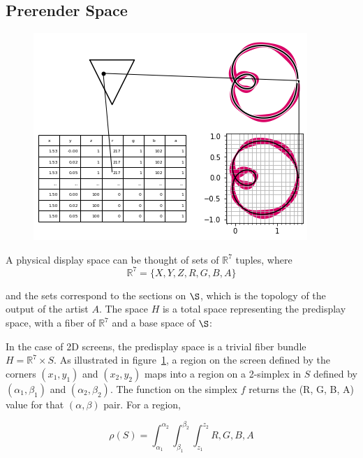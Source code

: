 \documentclass[../main.tex]{subfiles}
\begin{document}
\subsection{Prerender Space}
\label{sec:display}

\begin{figure}[h]
    \includegraphics[width=.4\linewidth]{figures/sections/math/render.png}
    \caption{}
    \label{fig:render}
\end{figure}

A physical display space can be thought of sets of $\mathbb{R}^{7}$ tuples, where 
\begin{equation}
    \mathbb{R}^{7} = \{X, Y, Z, R, G, B, A\}
\end{equation}

and the sets correspond to the sections on $\S$, which is the topology of the output of the artist $A$. The space $H$ is a total space representing the predisplay space, with a fiber of $\mathbb{R}^7$ and a base space of $\S$:



In the case of 2D screens, the predisplay space is a trivial fiber bundle $H=\mathbb{R}^{7}\times S$. As illustrated in figure~\ref{fig:render}, a region on the screen defined by the corners $(x_1, y_1)$ and $(x_2, y_2)$ maps into a region on a 2-simplex in $S$ defined by $(\alpha_1, \beta_1)$ and $(\alpha_2, \beta_2)$. The function on the simplex $f$ returns the (R, G, B, A) value for that $(\alpha, \beta)$ pair. For a region, 

\begin{equation*}
\rho(S) = \int_{\alpha_1}^{\alpha_2}\int_{\beta_1}^{\beta_2}\int_{z_1}^{z_2}{R, G, B, A}  
\end{equation*}
\end{document}
